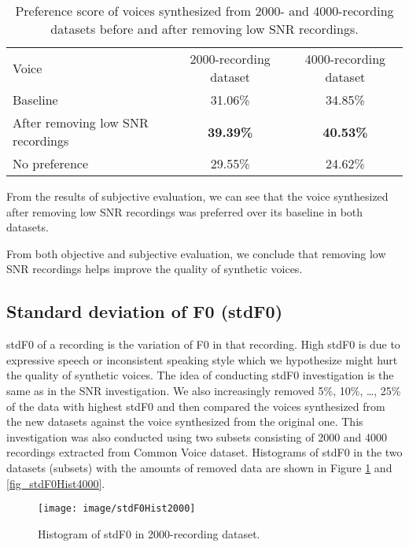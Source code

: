 \documentclass[12pt]{article}
\begin{document}
\begin{table}[]
\begin{center}
\caption{Preference score of voices synthesized from 2000- and 4000-recording datasets before and after removing low SNR recordings.}
\label{tab_subEvaSnr}
\vspace{3mm}
\begin{tabular}{lcc}
\hline
Voice & 2000-recording dataset & 4000-recording dataset \\
\cmidrule(l{0pt}r{2pt}){1-1}\cmidrule(l{0pt}r{2pt}){2-2}\cmidrule(l{0pt}r{2pt}){3-3}
Baseline          & 31.06\% & 34.85\% \\
After removing low SNR recordings  & \textbf{39.39\%} & \textbf{40.53\%} \\
No preference & 29.55\% & 24.62\% \\
\hline
\end{tabular}
\end{center}
\end{table}

From the results of subjective evaluation, we can see that the voice synthesized after removing low SNR recordings was preferred over its baseline in both datasets.

From both objective and subjective evaluation, we conclude that removing low SNR recordings helps improve the quality of synthetic voices.

\subsection{Standard deviation of F0 (stdF0)}
stdF0 of a recording is the variation of F0 in that recording. High stdF0 is due to expressive speech or inconsistent speaking style which we hypothesize might hurt the quality of synthetic voices. The idea of conducting stdF0 investigation is the same as in the SNR investigation. We also increasingly removed 5\%, 10\%, …, 25\% of the data with highest stdF0 and then compared the voices synthesized from the new datasets against the voice synthesized from the original one. This investigation was also conducted using two subsets consisting of 2000 and 4000 recordings extracted from Common Voice dataset. Histograms of stdF0 in the two datasets (subsets) with the amounts of removed data are shown in Figure \ref{fig_stdF0Hist2000} and \ref{fig_stdF0Hist4000}.

\begin{figure}[t]
\begin{center}
\texttt{[image: image/stdF0Hist2000]}
\end{center}
\vspace{-0.3cm}
\caption[stdF0 Hist 2000.]{Histogram of stdF0 in 2000-recording dataset.}
\label{fig_stdF0Hist2000}
\end{figure}
\end{document}
